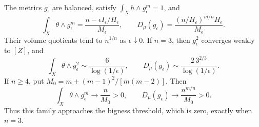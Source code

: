 \begin{proposition}\label{prop:radial-volume-test-limits}
The metrics $g_\epsilon$ are balanced, satisfy $\int_Xh\wedge g_\epsilon^m=1$, and
\begin{equation}\label{eq:radial-test-pairings}
 \int_X\theta\wedge g_\epsilon^m
   =\frac{n-\epsilon I_\epsilon/H_\epsilon}{M_\epsilon},
 \qquad D_\mu(g_\epsilon)
   =\frac{(n/H_\epsilon)^{m/n}H_\epsilon}{M_\epsilon}.
\end{equation}
Their volume quotients tend to $n^{1/n}$ as $\epsilon\downarrow0$. If $n=3$, then $g_\epsilon^2$ converges weakly to $[Z]$, and
\begin{equation}\label{eq:radial-threefold-test-collapse}
 \int_X\theta\wedge g_\epsilon^2
       \sim\frac6{\log(1/\epsilon)},
 \qquad D_\mu(g_\epsilon)
       \sim\frac{2\,3^{2/3}}{\log(1/\epsilon)}.
\end{equation}
If $n\geq4$, put $M_0=m+(m-1)^2/[m(m-2)]$. Then
\[
 \int_X\theta\wedge g_\epsilon^m\longrightarrow\frac n{M_0}>0,
 \qquad D_\mu(g_\epsilon)\longrightarrow\frac{n^{m/n}}{M_0}>0.
\]
Thus this family approaches the bigness threshold, which is zero, exactly when $n=3$.
\end{proposition}
